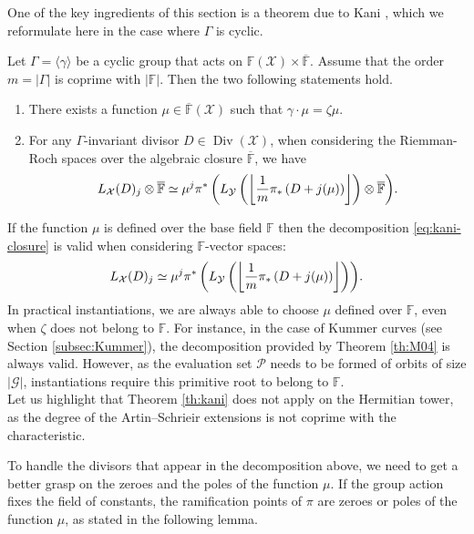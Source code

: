 \documentclass[a4paper,USenglish,autoref]{lipics-v2021}
\newcommand\F{\mathbb{F}}
\newcommand\floor[1]{\left\lfloor #1 \right\rfloor}
\renewcommand{\bar}{\overline}
\DeclareMathOperator{\Div}{Div}
\let\div\relax\DeclareMathOperator{\div}{div}
\newcommand{\size}[1]{\left|#1\right|}
\newcommand\calY{\mathcal{Y}}
\newcommand\calX{\mathcal{X}}
\newcommand\calP{\mathcal{P}}
\newcommand\calG{\mathcal{G}}
\begin{document}
One of the key ingredients of this section is a theorem due to Kani \cite{Kani}, which we reformulate here in the case where $\Gamma$ is cyclic.

\begin{theorem}\label{th:kani}
	Let $\Gamma=\langle \gamma \rangle$ be a cyclic group that acts on $\F(\calX) \times \overline{\F}$. Assume that the order $m = \size{\Gamma}$ is coprime with $\size{\F}$. Then the two following statements hold.
	\begin{enumerate}
		\item There exists a function $\mu \in \bar{\F}(\calX)$ such that $\gamma \cdot \mu = \zeta \mu$.
		\item For any $\Gamma$-invariant divisor $D \in \Div(\calX)$, when considering the Riemman-Roch spaces over the algebraic closure $\bar{\F}$, we have
		\begin{equation} \label{eq:kani-closure}
			{L_\calX(D)_j\otimes \bar{\F} \simeq \mu^j \pi^* \left(L_\calY\left(\floor{\frac{1}{m}\pi_*\left(D+j\div(\mu)\right)}\right)\otimes \bar{\F}\right)}.
		\end{equation}
	\end{enumerate}
	
\end{theorem}

\begin{remark}
	If the function $\mu$ is defined over the base field $\F$ then the decomposition \eqref{eq:kani-closure} is valid when considering $\F$-vector spaces:
	\[   {L_\calX(D)_j \simeq \mu^j \pi^* \left(L_\calY\left(\floor{\frac{1}{m}\pi_*\left(D+j\div(\mu)\right)}\right)\right)}.\] 
	In practical instantiations, we are always able to choose $\mu$ defined over $\F$, even when $\zeta$ does not belong to $\F$. For instance, in the case of Kummer curves (see Section \ref{subsec:Kummer}), the decomposition provided by Theorem \ref{th:M04} is always valid. However, as the evaluation set $\calP$ needs to be formed of orbits of size $\size \calG$, instantiations require this primitive root to belong to $\F$.\\
	Let us highlight that Theorem \ref{th:kani} does not apply on the Hermitian tower, as the degree of the Artin--Schrieir extensions is not coprime with the characteristic.
\end{remark}

To handle the divisors that appear in the decomposition above, we need to get a better grasp on the zeroes and the poles of the function $\mu$. If the group action fixes the field of constants, the ramification points of $\pi$ are zeroes or poles of the function $\mu$, as stated in the following lemma.
\end{document}
